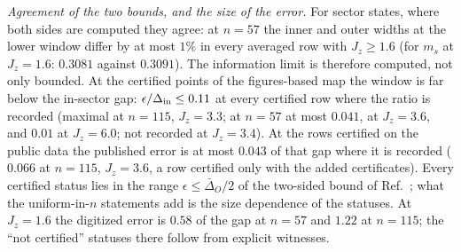 \documentclass[aps,prx,onecolumn,10pt,nofootinbib,longbibliography,floatfix]{revtex4-2}
\theoremstyle{remark}
\newcommand{\Jz}{J_z}
\newcommand{\ms}{m_s}
\begin{document}
\emph{Agreement of the two bounds, and the size of the error.} For sector states, where both sides are computed they agree: at $n=57$
the inner and outer widths at the lower window differ by at most $1\%$ in every averaged row with $\Jz\ge1.6$ (for %
$\ms$ at $\Jz=1.6$: $0.3081$ against $0.3091$). The information limit is therefore computed, not only bounded. At %
the certified points of the figures-based map the window is far below the in-sector gap: $\epsilon/\Delta_{\rm in}\le0.11$ at every certified %
row where the ratio is recorded (maximal at $n=115$, $\Jz=3.3$; at $n=57$ at most $0.041$, at $\Jz=3.6$, and $0.01$ %
at $\Jz=6.0$; not recorded at $\Jz=3.4$). At the rows certified on the public data the published error is at most $0.043$ of that %
gap where it is recorded ($0.066$ at $n=115$, $\Jz=3.6$, a row certified only with the added certificates). %
Every certified status lies in the range $\epsilon\le\bar\Delta_O/2$ of the two-sided bound of Ref.~\cite{manchanda2026}; %
what the uniform-in-$n$ statements add is the size dependence of the statuses. At $\Jz=1.6$ the digitized error is $0.58$ of %
the gap at $n=57$ and $1.22$ at $n=115$; the ``not certified'' statuses there follow from explicit witnesses. %
\end{document}

